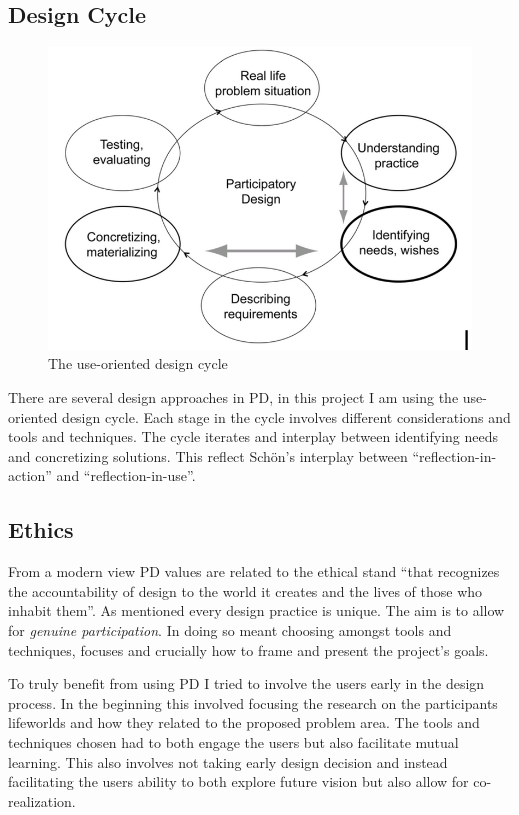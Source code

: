 \documentclass[UKenglish]{uiophd}
\begin{document}
	\subsection{Design Cycle}
		\begin{figure}
		    \centering
			\includegraphics[width=0.5\linewidth]{Images/DesignProcess}
		    \caption{The use-oriented design cycle \cite[p.128]{Bratteteig2013Organising}}
		    \label{The use-oriented design cycle}
		\end{figure}
		There are several design approaches in PD, in this project I am using the use-oriented design cycle. Each stage in the cycle involves different considerations and tools and techniques. The cycle iterates and interplay between identifying needs and concretizing solutions. This reflect Schön's interplay between ``reflection-in-action'' and ``reflection-in-use''\cite[p.~23]{Loewgren2004Thoughtful}.

	\subsection{Ethics}

		From a modern view PD values are related to the ethical stand ``that recognizes the accountability of design to the world it creates and the lives of those who inhabit them''\cite[p.~5]{Simonsen2012Routledge}. As mentioned every design practice is unique. The aim is to allow for \textit{genuine participation}. In doing so meant choosing amongst tools and techniques, focuses and crucially how to frame and present the project's goals. 

		To truly benefit from using PD I tried to involve the users early in the design process. In the beginning this involved focusing the research on the participants lifeworlds and how they related to the proposed problem area. 
		The tools and techniques chosen had to both engage the users but also facilitate mutual learning. This also involves not taking early design decision and instead facilitating the users ability to both explore future vision but also allow for co-realization\cite[p.~10]{Velden2014Participatory}. 
\end{document}
